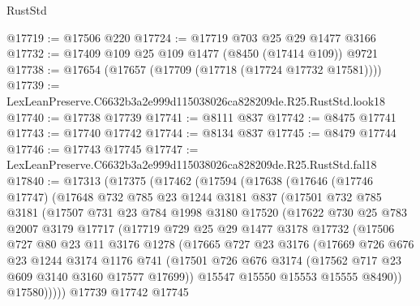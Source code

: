 \begin{lexlean}{RustStd}
\begin{coremodule}
@17719 := @17506 @220
@17724 := @17719 @703 @25 @29 @1477 @3166
@17732 := @17409 @109 @25 @109 @1477 (@8450 (@17414 @109)) @9721
@17738 := @17654 (@17657 (@17709 (@17718 (@17724 @17732 @17581))))
@17739 := LexLeanPreserve.C6632b3a2e999d115038026ca828209de.R25.RustStd.look18
@17740 := @17738 @17739
@17741 := @8111 @837
@17742 := @8475 @17741
@17743 := @17740 @17742
@17744 := @8134 @837
@17745 := @8479 @17744
@17746 := @17743 @17745
@17747 := LexLeanPreserve.C6632b3a2e999d115038026ca828209de.R25.RustStd.fal18
@17840 := @17313
    (@17375
      (@17462
        (@17594
          (@17638
            (@17646
              (@17746 @17747)
              (@17648
                @732
                @785
                @23
                @1244
                @3181
                @837
                (@17501
                  @732
                  @785
                  @3181
                  (@17507
                    @731
                    @23
                    @784
                    @1998
                    @3180
                    @17520
                    (@17622
                      @730
                      @25
                      @783
                      @2007
                      @3179
                      @17717
                      (@17719
                        @729
                        @25
                        @29
                        @1477
                        @3178
                        @17732
                        (@17506
                          @727
                          @80
                          @23
                          @11
                          @3176
                          @1278
                          (@17665
                            @727
                            @23
                            @3176
                            (@17669
                              @726
                              @676
                              @23
                              @1244
                              @3174
                              @1176
                              @741
                              (@17501
                                @726
                                @676
                                @3174
                                (@17562 @717 @23 @609 @3140 @3160 @17577 @17699))
                              @15547
                              @15550
                              @15553
                              @15555
                              @8490))
                          @17580)))))
                @17739
                @17742
                @17745

\end{coremodule}
\end{lexlean}
